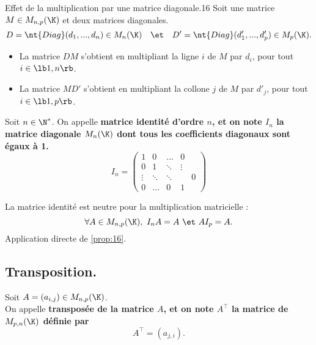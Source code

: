 \documentclass[11pt]{article}
\begin{document}
\begin{prop}{Effet de la multiplication par une matrice diagonale.}{16}
    Soit une matrice $M\in M_{n,p}(\K)$ et deux matrices diagonales.
    \begin{equation*}
        D=\nt{Diag}(d_1,...,d_n)\in M_n(\K) \quad\et\quad D'=\nt{Diag}(d_1',...,d_p')\in M_p(\K).
    \end{equation*}
    \begin{itemize}
        \item La matrice $DM$ s'obtient en multipliant la ligne $i$ de $M$ par $d_i$, pour tout $i\in\lb1,n\rb$.
        \item La matrice $MD'$ s'obtient en multipliant la collone $j$ de $M$ par $d'_j$, pour tout $i\in\lb1,p\rb$.
    \end{itemize}
\end{prop}

\begin{defi}{}{}
    Soit $n\in\N^*$. On appelle \bf{matrice identité} d'ordre $n$, et on note $I_n$ la matrice diagonale $M_n(\K)$ dont tous les coefficients diagonaux sont égaux à 1.
    \begin{equation*}
        I_n = \begin{pmatrix}
            1&0&...&0\\
            0&1&\ddots&\vdots\\
            \vdots&\ddots&\ddots&&0\\
            0&...&0&1
        \end{pmatrix}
    \end{equation*}
\end{defi}

\begin{prop}{}{}
    La matrice identité est neutre pour la multiplication matricielle :
    \begin{equation*}
        \forall A \in M_{n,p}(\K), ~ I_nA=A ~\et~ AI_p=A.
    \end{equation*}
    \tcblower
    Application directe de \ref{prop:16}.
\end{prop}


\subsection{Transposition.}

\begin{defi}{}{}
    Soit $A=(a_{i,j})\in M_{n,p}(\K)$.\\
    On appelle \bf{transposée} de la matrice $A$, et on note $A^\top$ la matrice de $M_{p,n}(\K)$ définie par
    \begin{equation*}
        A^\top=(a_{j,i}).
    \end{equation*}
\end{defi}
\end{document}
